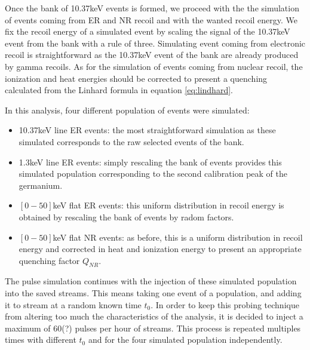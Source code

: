 Once the bank of 10.37keV events is formed, we proceed with the the simulation of events coming from ER and NR recoil and with the wanted recoil energy. We fix the recoil energy of a simulated event by scaling the signal of the 10.37keV event from the bank with a rule of three. Simulating event coming from electronic recoil is straightforward as the 10.37keV event of the bank are already produced by gamma recoils. As for the simulation of events coming from nuclear recoil, the ionization and heat energies should be corrected to present a quenching calculated from the Linhard formula in equation \ref{eq:lindhard}.

In this analysis, four different population of events were simulated:
\begin{itemize}
	\item 10.37keV line ER events: the most straightforward simulation as these simulated corresponds to the raw selected events of the bank.
	\item 1.3keV line ER events: simply rescaling the bank of events provides this simulated population corresponding to the second calibration peak of the germanium.
	\item $[0-50]$keV flat ER events: this uniform distribution in recoil energy is obtained by rescaling the bank of events by radom factors.
	\item $[0-50]$keV flat NR events: as before, this is a uniform distribution in recoil energy and corrected in heat and ionization energy to present an appropriate quenching factor $Q_{NR}$.
\end{itemize}

The pulse simulation continues with the injection of these simulated population into the saved streams. This means taking one event of a population, and adding it to stream at a random known time $t_0$. In order to keep this probing technique from altering too much the characteristics of the analysis, it is decided to inject a maximum of 60(?) pulses per hour of streams. This process is repeated multiples times with different $t_0$ and for the four simulated population independently.

